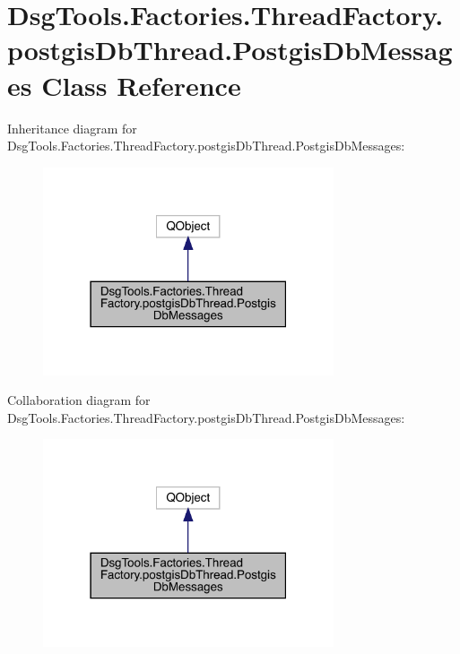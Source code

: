 \hypertarget{class_dsg_tools_1_1_factories_1_1_thread_factory_1_1postgis_db_thread_1_1_postgis_db_messages}{}\section{Dsg\+Tools.\+Factories.\+Thread\+Factory.\+postgis\+Db\+Thread.\+Postgis\+Db\+Messages Class Reference}
\label{class_dsg_tools_1_1_factories_1_1_thread_factory_1_1postgis_db_thread_1_1_postgis_db_messages}


Inheritance diagram for Dsg\+Tools.\+Factories.\+Thread\+Factory.\+postgis\+Db\+Thread.\+Postgis\+Db\+Messages\+:
\nopagebreak
\begin{figure}[H]
\begin{center}
\leavevmode
\includegraphics[width=243pt]{class_dsg_tools_1_1_factories_1_1_thread_factory_1_1postgis_db_thread_1_1_postgis_db_messages__inherit__graph}
\end{center}
\end{figure}


Collaboration diagram for Dsg\+Tools.\+Factories.\+Thread\+Factory.\+postgis\+Db\+Thread.\+Postgis\+Db\+Messages\+:
\nopagebreak
\begin{figure}[H]
\begin{center}
\leavevmode
\includegraphics[width=243pt]{class_dsg_tools_1_1_factories_1_1_thread_factory_1_1postgis_db_thread_1_1_postgis_db_messages__coll__graph}
\end{center}
\end{figure}
